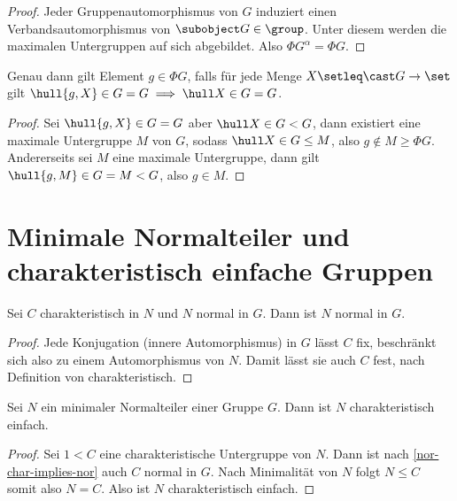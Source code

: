 \begin{proof}
    Jeder Gruppenautomorphismus von $G$ induziert einen Verbandsautomorphismus von $\subobject G\in\group$. Unter diesem werden die maximalen
    Untergruppen auf sich abgebildet. Also $\Phi G^\alpha=\Phi G$.
\end{proof}

\begin{lemma}
    Genau dann gilt Element $g\in\Phi G$, falls für jede Menge $X\setleq \cast G\to \set$ gilt $\hull{g,X}\in G=G \implies \hull X\in G = G$. 
\end{lemma}

\begin{proof}
    Sei $\hull{g,X}\in G = G$ aber $\hull X \in G < G$, dann existiert eine maximale Untergruppe $M$ von $G$, sodass $\hull X \in
    G\leq M$, also $g\not\in M\geq \Phi G$.
    Andererseits sei $M$ eine maximale Untergruppe, dann gilt $\hull{g,M}\in G= M<G$, also $g\in M$.
\end{proof}

\section{Minimale Normalteiler und charakteristisch einfache Gruppen}

\begin{lemma}\label{nor-char-implies-nor}
    Sei $C$ charakteristisch in $N$ und $N$ normal in $G$. Dann ist $N$ normal in $G$.
\end{lemma}

\begin{proof}
Jede Konjugation (innere Automorphismus) in $G$ lässt $C$ fix, beschränkt sich also zu einem Automorphismus von $N$. Damit lässt
sie auch $C$ fest, nach Definition von charakteristisch.    
\end{proof}

\begin{lemma}
    Sei $N$ ein minimaler Normalteiler einer Gruppe $G$. Dann ist $N$ charakteristisch einfach.
\end{lemma}

\begin{proof}
    Sei $1<C$ eine charakteristische Untergruppe von $N$. Dann ist nach \ref{nor-char-implies-nor} auch $C$ normal in $G$. Nach
    Minimalität von $N$ folgt $N\leq C$ somit also $N=C$. Also ist $N$ charakteristisch einfach.
\end{proof}

